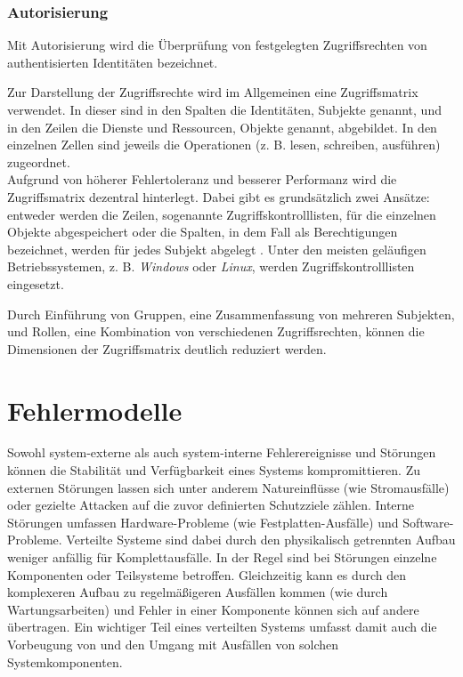 \documentclass[12pt,a4paper,parskip=half]{scrreprt}
\begin{document}
			\subsection{Autorisierung}
				
				Mit Autorisierung wird die Überprüfung von festgelegten Zugriffsrechten von authentisierten Identitäten bezeichnet. 
				
				Zur Darstellung der Zugriffsrechte wird im Allgemeinen eine Zugriffsmatrix verwendet. In dieser sind in den Spalten die Identitäten, Subjekte genannt, und in den Zeilen die Dienste und Ressourcen, Objekte genannt, abgebildet. In den einzelnen Zellen sind jeweils die Operationen (z. B. lesen, schreiben, ausführen) zugeordnet. \\
				Aufgrund von höherer Fehlertoleranz und besserer Performanz wird die Zugriffsmatrix dezentral hinterlegt. Dabei gibt es grundsätzlich zwei Ansätze: entweder werden die Zeilen, sogenannte Zugriffskontrolllisten, für die einzelnen Objekte abgespeichert oder die Spalten, in dem Fall als Berechtigungen bezeichnet, werden für jedes Subjekt abgelegt \cite{ITSicherheit}. Unter den meisten geläufigen Betriebssystemen, z. B. \textit{Windows} oder \textit{Linux}, werden Zugriffskontrolllisten eingesetzt.
				
				Durch Einführung von Gruppen, eine Zusammenfassung von mehreren Subjekten, und Rollen, eine Kombination von verschiedenen Zugriffsrechten, können die Dimensionen der Zugriffsmatrix deutlich reduziert werden.
				
	\chapter{Fehlermodelle}
		
		Sowohl system-externe als auch system-interne Fehlerereignisse und Störungen können die Stabilität und Verfügbarkeit eines Systems kompromittieren. Zu externen Störungen lassen sich unter anderem Natureinflüsse (wie Stromausfälle) oder gezielte Attacken auf die zuvor definierten Schutzziele zählen. Interne Störungen umfassen Hardware-Probleme (wie Festplatten-Ausfälle) und Software-Probleme. Verteilte Systeme sind dabei durch den physikalisch getrennten Aufbau weniger anfällig für Komplettausfälle. In der Regel sind bei Störungen einzelne Komponenten oder Teilsysteme betroffen. Gleichzeitig kann es durch den komplexeren Aufbau zu regelmäßigeren Ausfällen kommen (wie durch Wartungsarbeiten) und Fehler in einer Komponente können sich auf andere übertragen. Ein wichtiger Teil eines verteilten Systems umfasst damit auch die Vorbeugung von und den Umgang mit Ausfällen von solchen Systemkomponenten.
		
\end{document}
